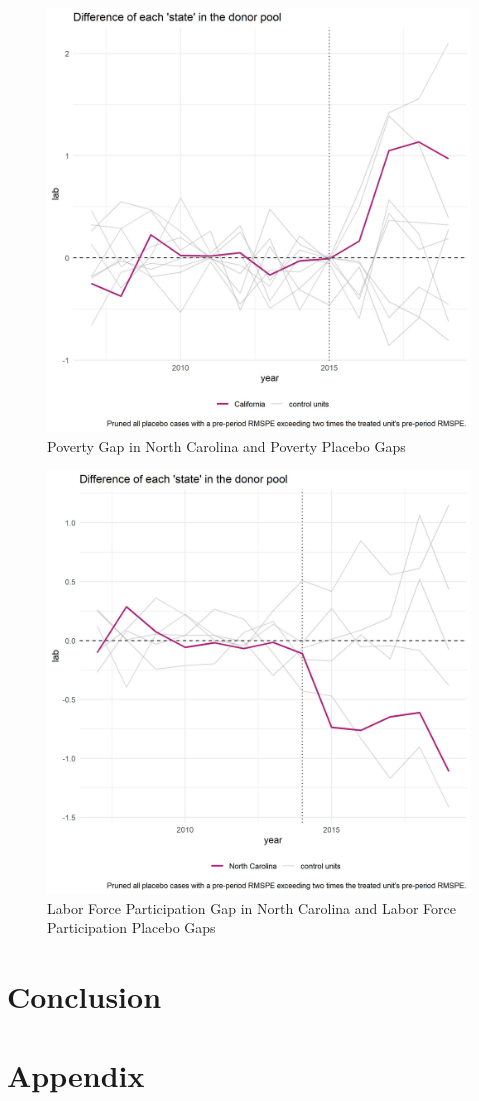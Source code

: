 \documentclass{article}
\newcommand*\InputTable[1]{}
\begin{document}
 \begin{figure}[H]
    \caption{Poverty Gap in North Carolina and Poverty Placebo Gaps}
    \begin{center}
        \includegraphics[width=.85\textwidth]{ca_lab_placebos}
    \end{center}
    \label{fig:ca_lab_placebos}{}
\end{figure}

 \begin{figure}[H]
    \caption{Labor Force Participation Gap in North Carolina and Labor Force Participation Placebo Gaps}
    \begin{center}
        \includegraphics[width=.85\textwidth]{nc_lab_placebos}
    \end{center}
    \label{fig:nc_lab_placebos}{}
\end{figure}

\section{Conclusion}



{}


\newpage
\section*{Appendix}

\InputTable{summarystats}
\InputTable{ca_lab}
\InputTable{ca_pov}
\InputTable{nc_lab}
\InputTable{nc_pov}
\end{document}
